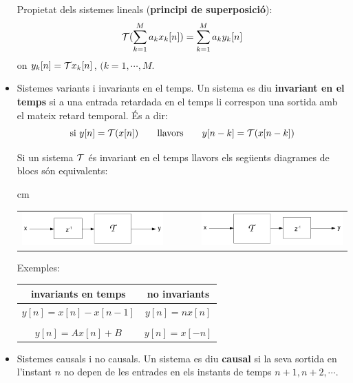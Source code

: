 \documentclass{article}
\begin{document}
\begin{itemize}
\vskip 0.2cm
\noindent
Propietat dels sistemes lineals (\textbf{principi de superposici\'o}):
\[
{\cal T}(\sum_{k=1}^M a_k x_k[n]) =  \sum_{k=1}^M a_k y_k[n]
\]
\noindent
on $y_k[n]={\cal T} x_k[n]$, $(k=1, \cdots, M$.


\item Sistemes variants i invariants en el temps.
Un sistema es diu \textbf{invariant en el temps} si
a una entrada retardada en el temps li correspon una
sortida amb el mateix retard temporal. \'Es a dir:
\[
\text{si } y[n]={\cal T}(x[n]) \qquad \text{llavors} \qquad
y[n-k]={\cal T}(x[n-k])
\]

\noindent
Si un sistema ${\cal T}$  \'es invariant en el temps llavors els seg\"uents diagrames de blocs 
s\'on equivalents:

 cm
\begin{center}
\begin{tabular}{ccc}
\begin{minipage}{6cm}\includegraphics[width=6cm]{tinvariant1.png}\end{minipage}
 & $\qquad$ &
\begin{minipage}{6cm}\includegraphics[width=6cm]{tinvariant2.png}\end{minipage}
\end{tabular}
\end{center}

\noindent
Exemples:
\begin{center}
\begin{tabular}{|c|c|}
 invariants en temps & no invariants \\ \hline
 $y[n]=x[n]-x[n-1]$ & $y[n]=nx[n]$  \\ & \\
 $y[n]=Ax[n]+B$ &  $y[n]=x[-n]$
\end{tabular}
\end{center}

\item Sistemes causals i no causals. Un sistema es diu \textbf{causal} si la seva
sortida en l'instant $n$ no depen de les entrades en els instants de temps
$n+1, n+2, \cdots$.


\end{itemize}
\end{document}
